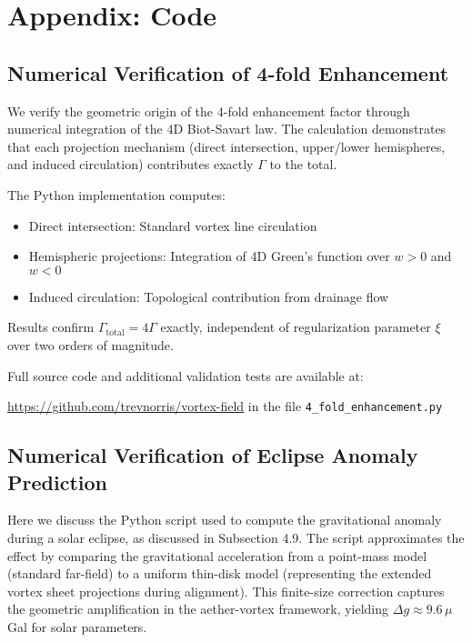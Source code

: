 \documentclass{article}
\begin{document}
\appendix

\section{Appendix: Code}

\subsection{Numerical Verification of 4-fold Enhancement}

We verify the geometric origin of the 4-fold enhancement factor through numerical integration of the 4D Biot-Savart law. The calculation demonstrates that each projection mechanism (direct intersection, upper/lower hemispheres, and induced circulation) contributes exactly $\Gamma$ to the total.

The Python implementation computes:
\begin{itemize}
\item Direct intersection: Standard vortex line circulation
\item Hemispheric projections: Integration of 4D Green's function over $w>0$ and $w<0$
\item Induced circulation: Topological contribution from drainage flow
\end{itemize}

Results confirm $\Gamma_{\text{total}} = 4\Gamma$ exactly, independent of regularization parameter $\xi$ over two orders of magnitude.

Full source code and additional validation tests are available at:

\noindent\url{https://github.com/trevnorris/vortex-field} in the file \verb|4_fold_enhancement.py|

\subsection{Numerical Verification of Eclipse Anomaly Prediction}

Here we discuss the Python script used to compute the gravitational anomaly during a solar eclipse, as discussed in Subsection 4.9. The script approximates the effect by comparing the gravitational acceleration from a point-mass model (standard far-field) to a uniform thin-disk model (representing the extended vortex sheet projections during alignment). This finite-size correction captures the geometric amplification in the aether-vortex framework, yielding \(\Delta g \approx 9.6 \, \mu\)Gal for solar parameters.
\end{document}
